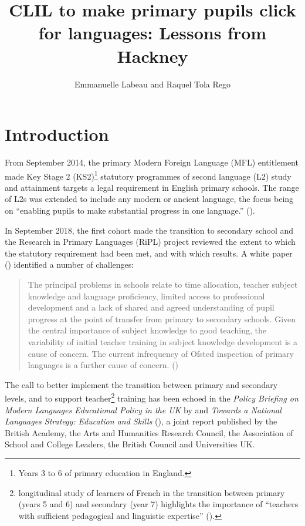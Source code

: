 \documentclass[output=paper]{langscibook}
\author{Emmanuelle Labeau\orcid{}\affiliation{Aston University} and Raquel Tola Rego\orcid{}\affiliation{Hackney Education}}
\title[CLIL to make primary pupils click for languages]
      {CLIL to make primary pupils click for languages: Lessons from Hackney}
\begin{document}
\maketitle 

\section{Introduction}

From September 2014, the primary Modern Foreign Language (MFL) entitlement made Key Stage 2 (KS2)\footnote{Years 3 to 6 of primary education in England.} statutory programmes of second language (L2) study and attainment targets a legal requirement in English primary schools. The range of L2s was extended to include any modern or ancient language, the focus being on “enabling pupils to make substantial progress in one language.” (\citealt[2]{DfE2013key}).

In September 2018, the first cohort made the transition to secondary school and the Research in Primary Languages (RiPL) project reviewed the extent to which the statutory requirement had been met, and with which results. A white paper (\citealt{HolmesMyles2019}) identified a number of challenges:

\begin{quote}
The principal problems in schools relate to time allocation, teacher subject knowledge and language proficiency, limited access to professional development and a lack of shared and agreed understanding of pupil progress at the point of transfer from primary to secondary schools. Given the central importance of subject knowledge to good teaching, the variability of initial teacher training in subject knowledge development is a cause of concern. The current infrequency of Ofsted inspection of primary languages is a further cause of concern. (\citealt[9]{HolmesMyles2019})
\end{quote}

The call to better implement the transition between primary and secondary levels, and to support teacher\footnote{ longitudinal study of learners of French in the transition between primary (years 5 and 6) and secondary (year 7) highlights the importance of “teachers with sufficient pedagogical and linguistic expertise” (\citeyear[954]{GrahamEtAl2017}).} training has been echoed in the \textit{Policy Briefing on Modern Languages Educational Policy in the UK} by \citet{Ayres-BennettCarruthers2019} and \textit{Towards a National Languages Strategy: Education and Skills} (\citealt{British2020}), a joint report published by the British Academy, the Arts and Humanities Research Council, the Association of School and College Leaders, the British Council and Universities UK.
\end{document}
